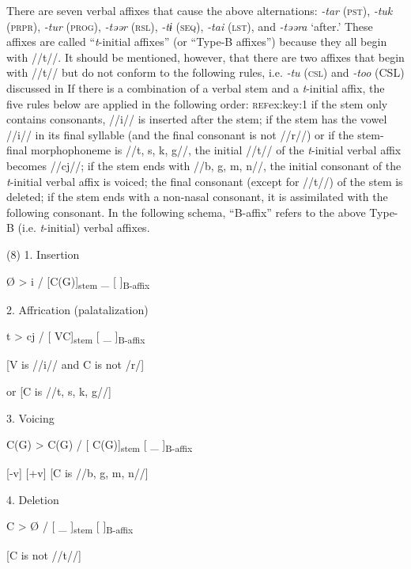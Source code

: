 There are seven verbal affixes that cause the above alternations: \textit{{}-tar} (\textsc{pst}), \textit{{}-tuk} (\textsc{prpr}), \textit{{}-tur} (\textsc{prog}), \textit{{}-təər} (\textsc{rsl}), \textit{-tɨ} (\textsc{seq}), \textit{{}-tai} (\textsc{lst}), and \textit{{}-təəra} ‘after.’ These affixes are called “\textit{t}{}-initial affixes” (or “Type-B affixes”) because they all begin with //t//. It should be mentioned, however, that there are two affixes that begin with //t// but do not conform to the following rules, i.e. \textit{{}-tu} (\textsc{csl}) and \textit{{}-too} (CSL) discussed in  If there is a combination of a verbal stem and a \textit{t}{}-initial affix, the five rules below are applied in the following order: \textsc{ref}{ex:key:1} if the stem only contains consonants, //i// is inserted after the stem;  if the stem has the vowel //i// in its final syllable (and the final consonant is not //r//) or if the stem-final morphophoneme is //t, s, k, g//, the initial //t// of the \textit{t}{}-initial verbal affix becomes //cj//;  if the stem ends with //b, g, m, n//, the initial consonant of the \textit{t}{}-initial verbal affix is voiced;  the final consonant (except for //t//) of the stem is deleted;  if the stem ends with a non-nasal consonant, it is assimilated with the following consonant. In the following schema, “B-affix” refers to the above Type-B (i.e. \textit{t}{}-initial) verbal affixes.

(8)  1.  Insertion

    Ø  >  i  /  [C(G)]\textsubscript{stem}  \_  [   ]\textsubscript{B-affix}

  2.  Affrication (palatalization)

    t  >  cj  /  [   VC]\textsubscript{stem}  [ \_  ]\textsubscript{B-affix}

            [V is //i// and C is not /r/]

or [C is //t, s, k, g//]    

  3.  Voicing

    C(G)  >  C(G)  /  [   C(G)]\textsubscript{stem}  [ \_  ]\textsubscript{B-affix}

    [-v]    [+v]    [C is //b, g, m, n//]    

  4.  Deletion

    C  >  Ø  /  [   \_ ]\textsubscript{stem}  [   ]\textsubscript{B-affix}

    [C is not //t//]      

